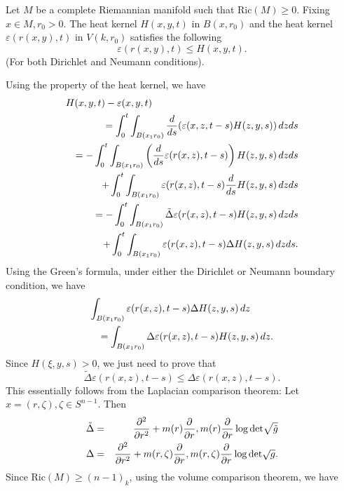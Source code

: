 \begin{theorem} Let $M$ be a complete Riemannian manifold such that  Ric$(M) \geq 0$. Fixing $ x \in M , r_0 > 0 $. The heat kernel $ H (x, y, t) $ in $ B(x, r_0) $ and the heat kernel $ \varepsilon (r (x, y) , t) $ in $ V (k, r_0) $ satisfies the following
%
\[ \varepsilon (r (x, y) , t) \leq H (x, y, t). \]
%
(For both Dirichlet and Neumann conditions).
\end{theorem}
 Using the property of the heat kernel, we have 
%
\begin{eqnarray*}
\lefteqn{H(x, y, t) - \varepsilon (x, y, t)} \\
&&= \int ^t _0 \int _{B (x_1 r_0)} \frac{d}{ds}  ( \varepsilon (x, z, t - s) H (z, y, s) ) \, d z ds\\
&&= - \int ^t _0 \int _{B (x_1 r_0) }\left( \frac{d}{ds}\varepsilon (r (x, z), t-s)\right) H(z, y, s)  \, d z ds\\
&&+ \int^t_0 \int _{B (x_1 r_0) }\varepsilon (r (x, z), t-s)\frac{d}{ds} H(z, y, s)  \, d z ds \\
&&= - \int^t_0 \int _{B (x_1 r_0)} \tilde{\Delta} \varepsilon (r (x, z), t - s) H(z, y, s)  \, d z ds\\
&&+ \int^t_0 \int _{B (x_1 r_0)}\varepsilon (r (x, z), t - s) \Delta H(z, y, s)  \, d z ds.
\end{eqnarray*}
Using the Green's formula, under either the Dirichlet or Neumann boundary condition, we have 
%
\begin{eqnarray*}
\lefteqn{\int _{B (x_1 r_0)}\varepsilon (r (x, z), t - s) \Delta H(z, y, s)  \, d z}\\
&&= \int _{B (x_1 r_0)}\Delta \varepsilon (r (x, z), t - s)  H(z, y, s)  \, d z.
\end{eqnarray*}
%
Since $ H(\xi, y, s)  > 0 $, we just need to prove that
%
\[ \tilde{\Delta} \varepsilon (r (x, z), t - s)\leq \Delta  \varepsilon (r (x, z), t - s).\]
%
This essentially follows from the Laplacian comparison theorem: Let $ x = (r, \zeta ) , \zeta \in S^{n-1} $. Then 
%
\begin{eqnarray*}
\tilde{\Delta } & = & \frac{\partial ^2}{\partial r^2} + m (r) \frac{\partial }{\partial r} , m (r) \frac{\partial }{\partial r} \log {\rm det} \sqrt{\tilde{g}}\\
\Delta & = & \frac{\partial ^2}{\partial r^2} + m (r,\zeta) \frac{\partial }{\partial r} , m (r,\zeta) \frac{\partial }{\partial r} \log {\rm det} \sqrt{{g}}.
\end{eqnarray*}
%
Since Ric$(M) \geq (n-1)_k$, using the volume comparison theorem, we have 

